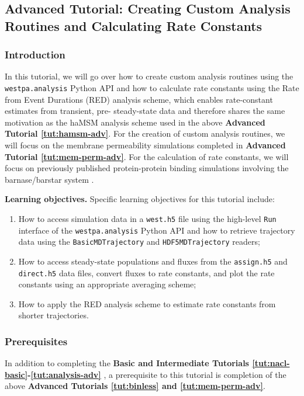 \subsection{Advanced Tutorial: Creating Custom Analysis Routines and Calculating Rate Constants}
\label{tut:cust-anal-adv}

\subsubsection{Introduction}

In this tutorial, we will go over how to create custom analysis routines using the \verb|westpa.analysis| Python API and how to calculate rate constants using the Rate from Event Durations (RED) analysis scheme, which enables rate-constant estimates from transient, pre- steady-state data and therefore shares the same motivation as the haMSM analysis scheme \citep{copperman_accelerated_2020,russo_westpa_2022} used in the above \textbf{Advanced Tutorial \ref{tut:hamsm-adv}}.
For the creation of custom analysis routines, we will focus on the membrane permeability simulations completed in \textbf{Advanced Tutorial \ref{tut:mem-perm-adv}}.
For the calculation of rate constants, we will focus on previously published protein-protein binding simulations involving the barnase/barstar system \citep{saglam_proteinprotein_2019}.   

\textbf{Learning objectives.} Specific learning objectives for this tutorial include:
\begin{enumerate}
    \item How to access simulation data in a \verb|west.h5| file using the high-level \verb|Run| interface of the \verb|westpa.analysis| Python API and how to retrieve trajectory data using the \verb|BasicMDTrajectory| and \verb|HDF5MDTrajectory| readers;
    \item How to access steady-state populations and fluxes from the \verb|assign.h5| and \verb|direct.h5| data files, convert fluxes to rate constants, and plot the rate constants using an appropriate averaging scheme;
    \item How to apply the RED analysis scheme to estimate rate constants from shorter trajectories.
\end{enumerate}

\subsubsection{Prerequisites}
In addition to completing the \textbf{Basic and Intermediate Tutorials \ref{tut:nacl-basic}-\ref{tut:analysis-adv}} \citep{bogetti_suite_2019}, a prerequisite to this tutorial is completion of the above \textbf{Advanced Tutorials \ref{tut:binless} and \ref{tut:mem-perm-adv}}.

